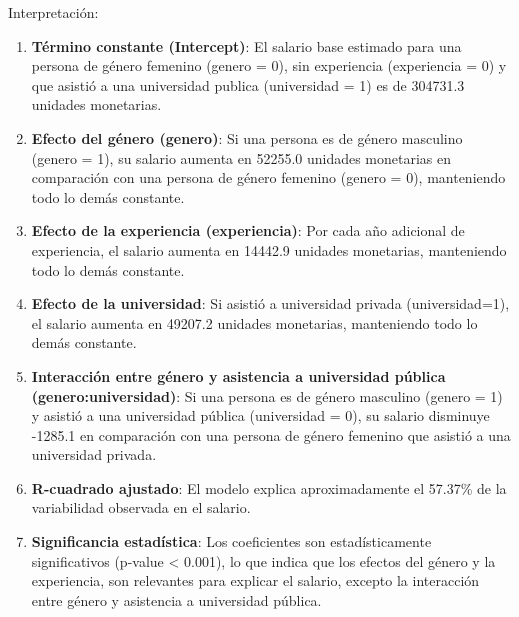 \documentclass[
]{article}
\newenvironment{Shaded}{\begin{snugshade}}{\end{snugshade}}
\newcommand{\AttributeTok}[1]{\textcolor[rgb]{0.13,0.29,0.53}{#1}}
\newcommand{\DecValTok}[1]{\textcolor[rgb]{0.00,0.00,0.81}{#1}}
\newcommand{\FunctionTok}[1]{\textcolor[rgb]{0.13,0.29,0.53}{\textbf{#1}}}
\newcommand{\NormalTok}[1]{#1}
\newcommand{\OtherTok}[1]{\textcolor[rgb]{0.56,0.35,0.01}{#1}}
\newcommand{\SpecialCharTok}[1]{\textcolor[rgb]{0.81,0.36,0.00}{\textbf{#1}}}
\newcommand{\StringTok}[1]{\textcolor[rgb]{0.31,0.60,0.02}{#1}}
\begin{document}
Interpretación:

\begin{enumerate}
\def\labelenumi{\arabic{enumi}.}
\item
  \textbf{Término constante (Intercept)}: El salario base estimado para
  una persona de género femenino (genero = 0), sin experiencia
  (experiencia = 0) y que asistió a una universidad publica (universidad
  = 1) es de 304731.3 unidades monetarias.
\item
  \textbf{Efecto del género (genero)}: Si una persona es de género
  masculino (genero = 1), su salario aumenta en 52255.0 unidades
  monetarias en comparación con una persona de género femenino (genero =
  0), manteniendo todo lo demás constante.
\item
  \textbf{Efecto de la experiencia (experiencia)}: Por cada año
  adicional de experiencia, el salario aumenta en 14442.9 unidades
  monetarias, manteniendo todo lo demás constante.
\item
  \textbf{Efecto de la universidad}: Si asistió a universidad privada
  (universidad=1), el salario aumenta en 49207.2 unidades monetarias,
  manteniendo todo lo demás constante.
\item
  \textbf{Interacción entre género y asistencia a universidad pública
  (genero:universidad)}: Si una persona es de género masculino (genero =
  1) y asistió a una universidad pública (universidad = 0), su salario
  disminuye -1285.1 en comparación con una persona de género femenino
  que asistió a una universidad privada.
\item
  \textbf{R-cuadrado ajustado}: El modelo explica aproximadamente el
  57.37\% de la variabilidad observada en el salario.
\item
  \textbf{Significancia estadística}: Los coeficientes son
  estadísticamente significativos (p-value \textless{} 0.001), lo que
  indica que los efectos del género y la experiencia, son relevantes
  para explicar el salario, excepto la interacción entre género y
  asistencia a universidad pública.
\end{enumerate}

\begin{Shaded}
\end{Shaded}
\end{document}
